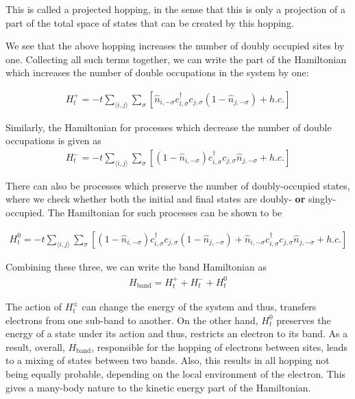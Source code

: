 \documentclass[]{report}
\begin{document}
This is called a projected hopping, in the sense that this is only a projection of a part of the total space of states that can be created by this hopping.

We see that the above hopping increases the number of doubly occupied sites by one. Collecting all such terms together, we can write the part of the Hamiltonian which increases the number of double occupations in the system by one:

\begin{align}\label{eqn:Ht+}
H^{+}_{t} = -t \sum_{\langle i, j \rangle} \sum_{\sigma} \left[ \hat{n}_{i, -\sigma} c^{\dagger}_{i, \sigma} c_{j, \sigma} (1 - \hat{n}_{j, -\sigma}) + h.c.\right]
\end{align}

Similarly, the Hamiltonian for processes which decrease the number of double occupations is given as
\begin{align}\label{eqn:Ht-}
	H^{-}_{t} = -t \sum_{\langle i, j \rangle} \sum_{\sigma} \left[ (1 - \hat{n}_{i, -\sigma}) c^{\dagger}_{i, \sigma} c_{j, \sigma} \hat{n}_{j, -\sigma} + h.c.\right]
\end{align}

There can also be processes which preserve the number of doubly-occupied states, where we check whether both the initial and final states are doubly- \textbf{or} singly-occupied. The Hamiltonian for such processes can be shown to be

\begin{align}\label{eqn:Ht0}
	H^{0}_{t} = -t \sum_{\langle i, j \rangle} \sum_{\sigma} \left[ (1 - \hat{n}_{i, -\sigma}) c^{\dagger}_{i, \sigma} c_{j, \sigma} (1 - \hat{n}_{j, -\sigma}) + \hat{n}_{i, -\sigma} c^{\dagger}_{i, \sigma} c_{j, \sigma} \hat{n}_{j, -\sigma} + h.c.\right]
\end{align}

Combining these three, we can write the band Hamiltonian as
\begin{align}\label{eqn:hband}
	H_{\mathrm{band}} = H^{+}_{t} + H^{-}_{t} + H^{0}_{t}
\end{align}

The action of $ H^{\pm}_{t} $ can change the energy of the system and thus, transfers electrons from one sub-band to another. On the other hand, $ H^{0}_{t} $ preserves the energy of a state under its action and thus, restricts an electron to its band. As a result, overall, $ H_{\mathrm{band}} $, responsible for the hopping of electrons between sites, leads to a mixing of states between two bands. Also, this results in all hopping not being equally probable, depending on the local environment of the electron. This gives a many-body nature to the kinetic energy part of the Hamiltonian.
\end{document}
